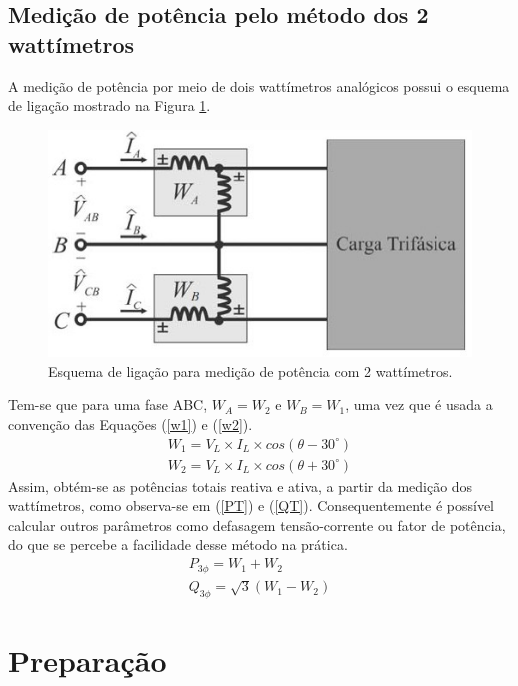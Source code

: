 \documentclass[a4paper,12pt,oneside,openany,table,xcdraw]{article}
\begin{document}
\subsection{Medição de potência pelo método dos 2 wattímetros} \label{potencias}
A medição de potência por meio de dois wattímetros analógicos possui o esquema de ligação mostrado na Figura \ref{watt:ligacao}.
\begin{figure}[H]
\centering
\captionsetup{font=scriptsize}
\includegraphics[width=13cm]{watt}
\caption{Esquema de ligação para medição de potência com 2 wattímetros.}
\label{watt:ligacao}
\end{figure}
Tem-se que para uma fase ABC, $W_A=W_2$ e $W_B=W_1$, uma vez que é usada a convenção das Equações (\ref{w1}) e (\ref{w2}).
\begin{gather}
W_1 = V_L \times I_L \times cos(\theta - 30^\circ)\label{w1}\\
W_2 = V_L \times I_L \times cos(\theta + 30^\circ)\label{w2}
\end{gather}
Assim, obtém-se as potências totais reativa e ativa, a partir da medição dos wattímetros, como observa-se em (\ref{PT}) e (\ref{QT}). Consequentemente é possível calcular outros parâmetros como defasagem tensão-corrente ou fator de potência, do que se percebe a facilidade desse método na prática.
\begin{gather}
P_{3\phi} = W_1 + W_2\label{PT}\\
Q_{3\phi} = \sqrt{3}(W_1 - W_2)\label{QT}
\end{gather}


\section{Preparação}
\end{document}

